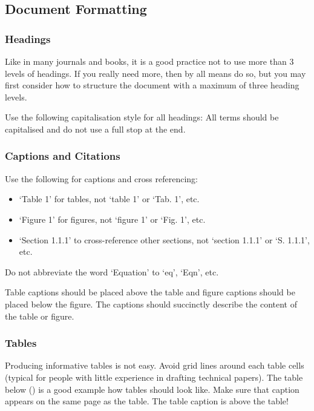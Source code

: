 \subsection{Document Formatting}
\label{sec:document-formatting}

\subsubsection{Headings}
\label{sec:headings}

Like in many journals and books, it is a good practice not to use more than 3 levels of headings. If you really need more, then by all means do so, but you may first consider how to structure the document with a maximum of three heading levels. 

Use the following capitalisation style for all headings: All terms should be capitalised and do not use a full stop at the end.

\subsubsection{Captions and Citations}
\label{sec:captions-and-citations}

Use the following for captions and cross referencing:

\begin{itemize}
	\item ‘Table 1’ for tables, not ‘table 1’ or ‘Tab. 1’, etc.
	\item ‘Figure 1’ for figures, not ‘figure 1’ or ‘Fig. 1’, etc.
	\item ‘Section 1.1.1’ to cross-reference other sections, not ‘section 1.1.1’ or ‘S. 1.1.1’, etc.
\end{itemize}

Do not abbreviate the word ‘Equation’ to ‘eq’, ‘Eqn’, etc.

Table captions should be placed above the table and figure captions should be placed below the figure. The captions should succinctly describe the content of the table or figure.

\subsubsection{Tables}
\label{sec:tables}

Producing informative tables is not easy. Avoid grid lines around each table cells (typical for people with little experience in drafting technical papers). The table below () is a good example how tables should look like. Make sure that caption appears on the same page as the table. The table caption is above the table!

